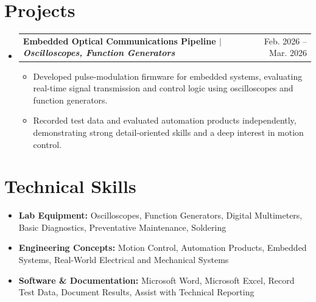 \documentclass[letterpaper,11pt]{article}
\makeatletter
\newcommand{\resumeItem}[1]{\item{#1}}
\newcommand{\resumeProjectHeading}[2]{
  \item
    \begin{tabular*}{0.97\textwidth}[t]{l@{\extracolsep{\fill}}r}
      \textbf{#1} & #2 \\
    \end{tabular*}
}
\newcommand{\resumeSubHeadingListStart}{\begin{itemize}[label=\textbullet]}
\newcommand{\resumeSubHeadingListEnd}{\end{itemize}}
\newcommand{\resumeItemListStart}{\begin{itemize}[label=-]}
\newcommand{\resumeItemListEnd}{\end{itemize}}
\makeatother
\begin{document}
\section{Projects}
\resumeSubHeadingListStart
  \resumeProjectHeading{Embedded Optical Communications Pipeline $\vert$ \emph{Oscilloscopes, Function Generators}}{Feb. 2026 -- Mar. 2026}
  \resumeItemListStart
    \resumeItem{Developed pulse-modulation firmware for embedded systems, evaluating real-time signal transmission and control logic using oscilloscopes and function generators.}
    \resumeItem{Recorded test data and evaluated automation products independently, demonstrating strong detail-oriented skills and a deep interest in motion control.}
  \resumeItemListEnd
\resumeSubHeadingListEnd

\section{Technical Skills}
\resumeSubHeadingListStart
  \item{\textbf{Lab Equipment:} Oscilloscopes, Function Generators, Digital Multimeters, Basic Diagnostics, Preventative Maintenance, Soldering}
  \item{\textbf{Engineering Concepts:} Motion Control, Automation Products, Embedded Systems, Real-World Electrical and Mechanical Systems}
  \item{\textbf{Software \& Documentation:} Microsoft Word, Microsoft Excel, Record Test Data, Document Results, Assist with Technical Reporting}
\resumeSubHeadingListEnd
\end{document}
